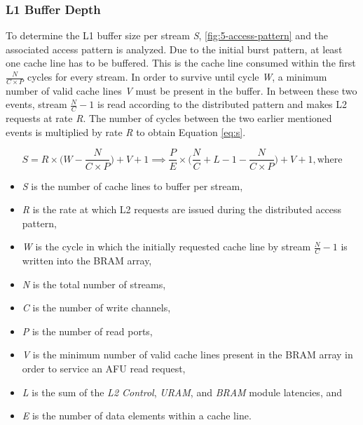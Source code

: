 \subsubsection{L1 Buffer Depth}
\label{sec:buffer}
To determine the L1 buffer size per stream \textit{S}, \autoref{fig:5-access-pattern} and the associated access pattern is analyzed. Due to the initial burst pattern, at least one cache line has to be buffered. This is the cache line consumed within the first $\frac{N}{C \times P}$ cycles for every stream. In order to survive until cycle \textit{W}, a minimum number of valid cache lines \textit{V} must be present in the buffer. In between these two events, stream $\frac{N}{C}-1$ is read according to the distributed pattern and makes L2 requests at rate \textit{R}. The number of cycles between the two earlier mentioned events is multiplied by rate \textit{R} to obtain Equation \ref{eq:s}.

\begin{equation}
  S = R \times \bigg( W - \frac{N}{C \times P} \bigg) + V + 1 \implies \frac{P}{E} \times \bigg( \frac{N}{C} + L - 1 - \frac{N}{C \times P} \bigg) + V + 1, \text{where}
  \label{eq:s}
\end{equation}

\begin{itemize}
  \item{\textit{S} is the number of cache lines to buffer per stream,}
  \item{\textit{R} is the rate at which L2 requests are issued during the distributed access pattern,}
  \item{\textit{W} is the cycle in which the initially requested cache line by stream $\frac{N}{C}-1$ is written into the BRAM array,}
  \item{\textit{N} is the total number of streams,}
  \item{\textit{C} is the number of write channels,}
  \item{\textit{P} is the number of read ports,}
  \item{\textit{V} is the minimum number of valid cache lines present in the BRAM array in order to service an AFU read request,}
  \item{\textit{L} is the sum of the \textit{L2 Control}, \textit{URAM}, and \textit{BRAM} module latencies, and}
  \item{\textit{E} is the number of data elements within a cache line.}
\end{itemize}



